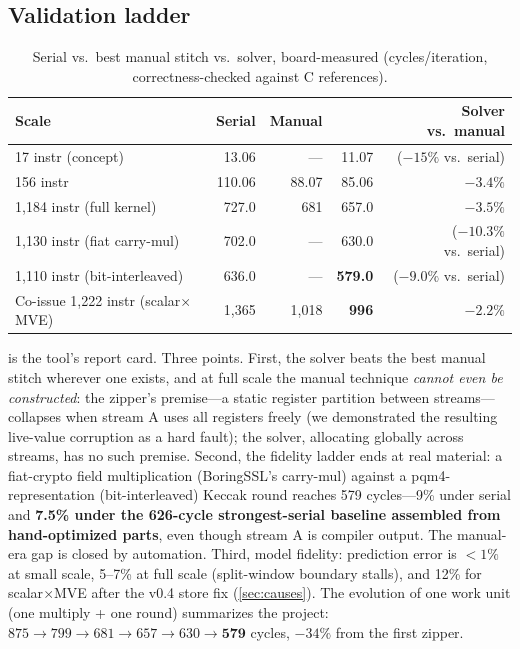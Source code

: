\documentclass[11pt,a4paper]{article}
\begin{document}
\subsection{Validation ladder}
\begin{table}[t]\centering
\caption{Serial vs.\ best manual stitch vs.\ solver, board-measured
(cycles/iteration, correctness-checked against C references).}
\label{tab:solver}
\begin{tabular}{lrrrr}\toprule
Scale & Serial & Manual & \slothy{} & Solver vs.\ manual\\\midrule
17 instr (concept) & 13.06 & --- & 11.07 & ($-15\%$ vs.\ serial)\\
156 instr & 110.06 & 88.07 & 85.06 & $-3.4\%$\\
1,184 instr (full kernel) & 727.0 & 681 & 657.0 & $-3.5\%$\\
1,130 instr (fiat carry-mul) & 702.0 & --- & 630.0 & ($-10.3\%$ vs.\ serial)\\
1,110 instr (bit-interleaved) & 636.0 & --- & \textbf{579.0} & ($-9.0\%$ vs.\ serial)\\
Co-issue 1,222 instr (scalar$\times$MVE) & 1,365 & 1,018 & \textbf{996} & $-2.2\%$\\\bottomrule
\end{tabular}\end{table}

 is the tool's report card. Three points. First, the solver
beats the best manual stitch wherever one exists, and at full scale the manual
technique \emph{cannot even be constructed}: the zipper's premise---a static
register partition between streams---collapses when stream A uses all
registers freely (we demonstrated the resulting live-value corruption as a
hard fault); the solver, allocating globally across streams, has no such
premise. Second, the fidelity ladder ends at real material: a
fiat-crypto field multiplication (BoringSSL's carry-mul) against a
pqm4-representation (bit-interleaved) Keccak round reaches 579 cycles---9\%
under serial and \textbf{7.5\% under the 626-cycle strongest-serial baseline
assembled from hand-optimized parts}, even though stream A is compiler
output. The manual-era gap is closed by automation. Third, model fidelity:
prediction error is ${<}1\%$ at small scale, 5--7\% at full scale (split-window
boundary stalls), and 12\% for scalar$\times$MVE after the v0.4 store fix
(\cref{sec:causes}). The evolution of one work unit (one multiply + one round)
summarizes the project: $875 \to 799 \to 681 \to 657 \to 630 \to \mathbf{579}$
cycles, $-34\%$ from the first zipper.
\end{document}

